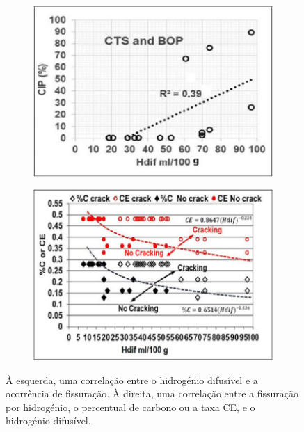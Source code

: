 \begin{figure}[htb]
    \centering
    \begin{subfigure}{.4\textwidth}
      \centering
      \includegraphics[width = 0.9\linewidth]{Figures/Cap2/Hdif_CE.png}
      \caption{}
      \label{fig:Hdif_CE}
    \end{subfigure}%
    \begin{subfigure}{.4\textwidth}
      \centering
      \includegraphics[width = 0.9\linewidth]{Figures/Cap2/CE_Hdif_Crack.png}
      \caption{}
      \label{fig:CE_Hdif_Crack}
    \end{subfigure}
    \caption[Correlações entre hidrogénio difusível e fissuração induzida por hidrogénio]%
    {À esquerda, uma correlação entre o hidrogénio difusível e a ocorrência de fissuração. À direita, uma correlação entre a fissuração por hidrogénio, o percentual de carbono ou a taxa CE, e o hidrogénio difusível.}
    \end{figure}
